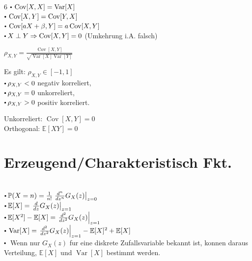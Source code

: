 \documentclass[8pt,a4paper,landscape]{extarticle}
\begin{document}
\begin{multicols*}{6}
\CheatsheetItemListStart
\CheatsheetItemListEnd
$\sbullet \operatorname{Cov}[X,X] = \operatorname{Var}[X]$ \\
$\sbullet \operatorname{Cov}[X,Y] = \operatorname{Cov}[Y,X]$ \\
$\sbullet \operatorname{Cov}[aX+\beta,Y] = a\operatorname{Cov}[X,Y]$ \\
$\sbullet X \perp Y \Rightarrow \operatorname{Cov}[X,Y] = 0$ \quad (Umkehrung i.A. falsch)


$\rho_{X,Y} = \frac{\operatorname{Cov}[X,Y]}{\sqrt{\operatorname{Var}[X] \operatorname{Var}[Y]}}$ 
\vspace*{2pt}

Es gilt: $\rho_{X,Y} \in [-1,1]$ \\
$\sbullet \rho_{X,Y} < 0$ negativ korreliert, \\
$\sbullet \rho_{X,Y}=0$ unkorreliert, \\
$\sbullet \rho_{X,Y} > 0$ positiv korreliert.

\CheatsheetItemListStart
\CheatsheetItemListEnd
Unkorreliert: $\operatorname{Cov}[X,Y] = 0$ \\
Orthogonal: $\mathbb{E}[XY] = 0$


\section{Erzeugend/Charakteristisch Fkt.}

\vspace*{-4pt}
 \\
\vspace*{-7pt}
\CheatsheetItemListStart
\CheatsheetItemListEnd
\vspace*{0pt}
$\sbullet \mathbb{P}(X=n) = \frac{1}{n!}\left.\frac{d^n}{dz^n}G_X(z)\right|_{z=0}$ \\ [3pt]
$\sbullet \mathbb{E}[X] = \left.\frac{d}{dz}G_X(z)\right|_{z=1}$ \\ [3pt]
$\sbullet \mathbb{E}[X^2]-\mathbb{E}[X] = \left.\frac{d^2}{dz^2}G_X(z)\right|_{z=1}$ \\ [3pt]
$\sbullet \operatorname{Var}[X] = \left.\frac{d^2}{dz^2}G_X(z)\right|_{z=1} - \mathbb{E}[X]^2 + \mathbb{E}[X]$ \\ [3pt]
$\sbullet$ Wenn nur $G_X(z)$ fur eine diskrete Zufallsvariable bekannt ist, konnen daraus Verteilung, $\mathbb{E}[X]$ und $\operatorname{Var}[X]$ bestimmt werden. \\
\vspace*{-7pt}


\end{multicols*}
\end{document}
